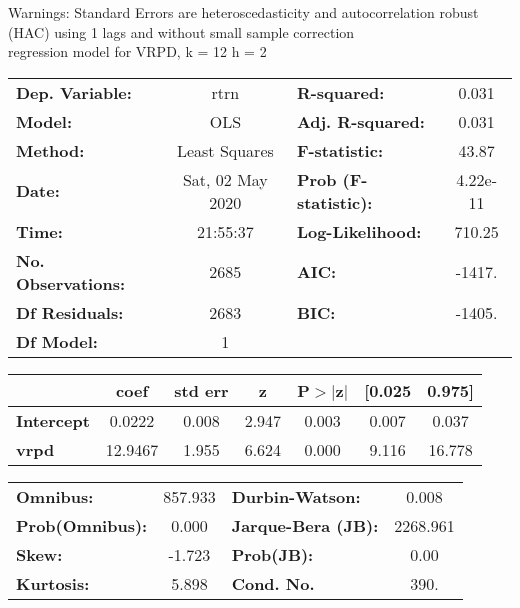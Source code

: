 Warnings: \newline
 [1] Standard Errors are heteroscedasticity and autocorrelation robust (HAC) using 1 lags and without small sample correction\\ 

regression model for VRPD, k = 12 h = 2\begin{center}
\begin{tabular}{lclc}
\toprule
\textbf{Dep. Variable:}    &       rtrn       & \textbf{  R-squared:         } &     0.031   \\
\textbf{Model:}            &       OLS        & \textbf{  Adj. R-squared:    } &     0.031   \\
\textbf{Method:}           &  Least Squares   & \textbf{  F-statistic:       } &     43.87   \\
\textbf{Date:}             & Sat, 02 May 2020 & \textbf{  Prob (F-statistic):} &  4.22e-11   \\
\textbf{Time:}             &     21:55:37     & \textbf{  Log-Likelihood:    } &    710.25   \\
\textbf{No. Observations:} &        2685      & \textbf{  AIC:               } &    -1417.   \\
\textbf{Df Residuals:}     &        2683      & \textbf{  BIC:               } &    -1405.   \\
\textbf{Df Model:}         &           1      & \textbf{                     } &             \\
\bottomrule
\end{tabular}
\begin{tabular}{lcccccc}
                   & \textbf{coef} & \textbf{std err} & \textbf{z} & \textbf{P$> |$z$|$} & \textbf{[0.025} & \textbf{0.975]}  \\
\midrule
\textbf{Intercept} &       0.0222  &        0.008     &     2.947  &         0.003        &        0.007    &        0.037     \\
\textbf{vrpd}      &      12.9467  &        1.955     &     6.624  &         0.000        &        9.116    &       16.778     \\
\bottomrule
\end{tabular}
\begin{tabular}{lclc}
\textbf{Omnibus:}       & 857.933 & \textbf{  Durbin-Watson:     } &    0.008  \\
\textbf{Prob(Omnibus):} &   0.000 & \textbf{  Jarque-Bera (JB):  } & 2268.961  \\
\textbf{Skew:}          &  -1.723 & \textbf{  Prob(JB):          } &     0.00  \\
\textbf{Kurtosis:}      &   5.898 & \textbf{  Cond. No.          } &     390.  \\
\bottomrule
\end{tabular}
\end{center}

